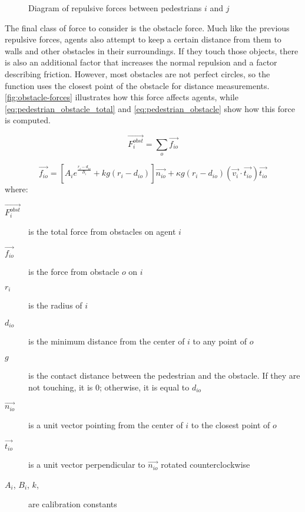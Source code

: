 \documentclass[twoside, 11pt]{article}
\begin{document}
\begin{figure}[h]
  \centering
  
  \caption{Diagram of repulsive forces between pedestrians $i$ and $j$}
  \label{fig:repulsive-forces}
\end{figure}

The final class of force to consider is the obstacle force. Much like the previous repulsive forces, agents also attempt to keep a certain distance from them to walls and other obstacles in their surroundings. If they touch those objects, there is also an additional factor that increases the normal repulsion and a factor describing friction. However, most obstacles are not perfect circles, so the function uses the closest point of the obstacle for distance measurements. \autoref{fig:obstacle-forces} illustrates how this force affects agents, while \autoref{eq:pedestrian_obstacle_total} and \autoref{eq:pedestrian_obstacle} show how this force is computed.

\begin{equation}
  \vec{F_i^{obst}} = \sum_o\vec{f_{io}}
  \label{eq:pedestrian_obstacle_total}
\end{equation}

\begin{equation}
  \vec{f_{io}} = [A_ie^{\frac{r_i - d_{io}}{B_i}} + kg(r_i-d_{io})]\vec{n_{io}} + \kappa g (r_i - d_{io})(\vec{v_i} \cdot \vec{t_{io}})\vec{t_{io}}
  \label{eq:pedestrian_obstacle}
\end{equation}
where:
\begin{description}
  \item[$\vec{F_i^{obst}}$] is the total force from obstacles on agent $i$
  \item[$\vec{f_{io}}$] is the force from obstacle $o$ on $i$
  \item[$r_i$] is the radius of $i$
  \item[$d_{io}$] is the minimum distance from the center of $i$ to any point of $o$
  \item[$g$] is the contact distance between the pedestrian and the obstacle. If they are not touching, it is $0$; otherwise, it is equal to $d_{io}$
  \item[$\vec{n_{io}}$] is a unit vector pointing from the center of $i$ to the closest point of $o$
  \item[$\vec{t_{io}}$] is a unit vector perpendicular to $\vec{n_{io}}$ rotated counterclockwise
  \item[$A_i$, $B_i$, $k$, \kappa] are calibration constants
\end{description}
\end{document}

